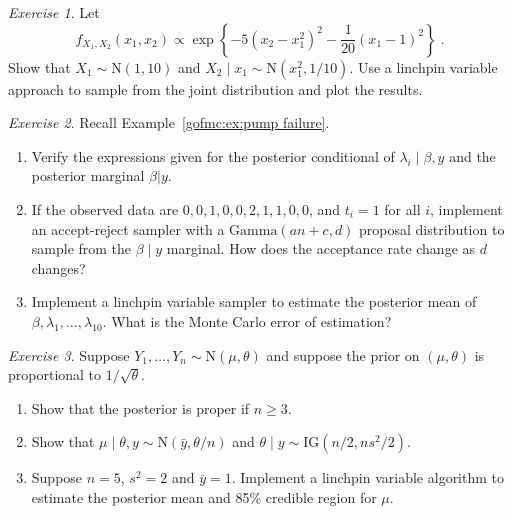 \documentclass[12pt]{article}
\theoremstyle{plain}
\theoremstyle{definition}
\theoremstyle{remark}
\newtheorem{hw}{Exercise}[section]
\begin{document}
\begin{hw}
Let
$$
f_{X_1, X_2}(x_1, x_2) \propto \exp \left\{ -5(x_2 - x_{1}^{2})^{2} -
  \frac{1}{20} (x_1 - 1)^{2} \right\} \; . 
$$
Show that $X_1 \sim \text{N}(1,10)$ and $X_{2}\mid x_1 \sim
\text{N}(x_{1}^2, 1/10)$. Use a linchpin variable approach to sample
from the joint distribution and plot the results.   
\end{hw}

\begin{hw}\label{gofmc:hw:pump failure}
Recall Example~\ref{gofmc:ex:pump failure}.  
\begin{enumerate}
\item Verify the expressions given for the posterior conditional of
  $\lambda_i \mid \beta, y$ and the posterior marginal $\beta |y$. 
\item If the observed data are $0, 0, 1, 0, 0, 2, 1, 1, 0, 0$, and
  $t_i =1$ for all $i$, implement an accept-reject sampler with a
  $\text{Gamma}(an+c , d)$ proposal distribution to sample from the
  $\beta \mid y$ marginal.  How does the acceptance rate change as $d$
  changes? 

\item Implement a linchpin variable sampler to estimate the posterior
  mean of $\beta, \lambda_1, \ldots, \lambda_{10}$.  What is the Monte
  Carlo error of estimation? 
\end{enumerate}
\end{hw}

\begin{hw} \label{gofmc:hw:jh2001}
Suppose $Y_{1},\ldots,Y_{n} \sim \text{N}(\mu, \theta)$ and suppose
the prior on $(\mu, \theta)$ is proportional to $1/\sqrt{\theta}$. 
\begin{enumerate}
\item Show that the posterior is proper if $n \ge 3$.
\item Show that $\mu \mid \theta, y \sim \text{N}(\bar{y}, \theta /
  n)$ and $\theta \mid y \sim \text{IG}(n/2, ns^{2} / 2)$.
\item Suppose $n=5$, $s^{2} = 2$ and $\bar{y}=1$.  Implement a
  linchpin variable algorithm to estimate the posterior mean and 85\%
  credible region for $\mu$.  
\end{enumerate}
\end{hw}
\end{document}
